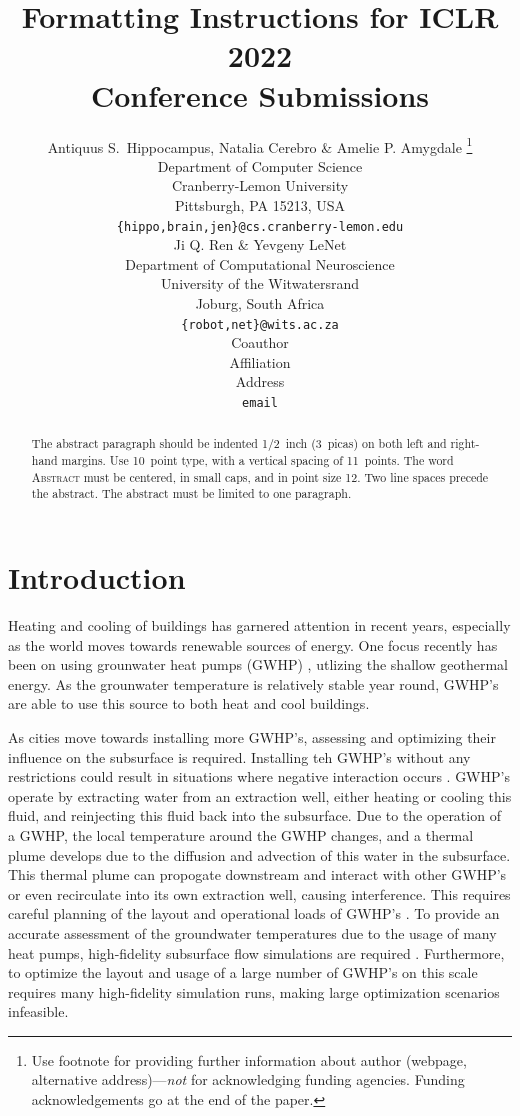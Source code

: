 \documentclass{article} %
\title{Formatting Instructions for ICLR 2022 \\ Conference Submissions}
\author{Antiquus S.~Hippocampus, Natalia Cerebro \& Amelie P. Amygdale \thanks{ Use footnote for providing further information
about author (webpage, alternative address)---\emph{not} for acknowledging
funding agencies.  Funding acknowledgements go at the end of the paper.} \\
Department of Computer Science\\
Cranberry-Lemon University\\
Pittsburgh, PA 15213, USA \\
\texttt{\{hippo,brain,jen\}@cs.cranberry-lemon.edu} \\
\And
Ji Q. Ren \& Yevgeny LeNet \\
Department of Computational Neuroscience \\
University of the Witwatersrand \\
Joburg, South Africa \\
\texttt{\{robot,net\}@wits.ac.za} \\
\AND
Coauthor \\
Affiliation \\
Address \\
\texttt{email}
}
\begin{document}
\maketitle

\begin{abstract}
   The abstract paragraph should be indented 1/2~inch (3~picas) on both left and
   right-hand margins. Use 10~point type, with a vertical spacing of 11~points.
   The word \textsc{Abstract} must be centered, in small caps, and in point size 12. Two
   line spaces precede the abstract. The abstract must be limited to one
   paragraph.
\end{abstract}

\section{Introduction}
\label{sec:intro}

Heating and cooling of buildings has garnered attention in recent years, especially as the world moves towards renewable sources of energy. 
One focus recently has been on using grounwater heat pumps (GWHP) \cite{Halilovic2022}, utlizing the shallow geothermal energy. 
As the grounwater temperature is relatively stable year round, GWHP's are able to use this source to both heat and cool buildings. %

As cities move towards installing more GWHP's, assessing and optimizing their influence on the subsurface is required. 
Installing teh GWHP's without any restrictions could result in situations where negative interaction occurs \cite{Garcia2020, Daemi2019}. 
GWHP's operate by extracting water from an extraction well, either heating or cooling this fluid, and reinjecting this fluid back into the subsurface.  
Due to the operation of a GWHP, the local temperature around the GWHP changes, and a thermal plume develops due to the diffusion and advection of this water in the subsurface. 
This thermal plume can propogate downstream and interact with other GWHP's or even recirculate into its own extraction well, causing interference. 
This requires careful planning of the layout and operational loads of GWHP's \cite{Beck2013}. 
To provide an accurate assessment of the groundwater temperatures due to the usage of many heat pumps, high-fidelity subsurface flow simulations are required \cite{Meng2019}. 
Furthermore, to optimize the layout and usage of a large number of GWHP's on this scale requires many high-fidelity simulation runs, making large optimization scenarios infeasible.
\end{document}
